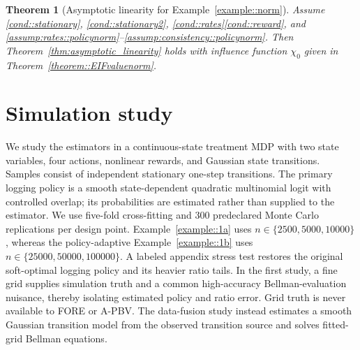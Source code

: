 \documentclass[12pt]{article}
\theoremstyle{plain}
\newtheorem{theorem}{Theorem}
\begin{document}
 
\begin{theorem}[Asymptotic linearity for Example~\ref{example::norm}]
\label{theorem::ALex2}
Assume \ref{cond::stationary}, \ref{cond::stationary2},
\ref{cond::rates}\ref{cond::reward}, and
\ref{assump:rates::policynorm}--\ref{assump:consistency::policynorm}.
Then Theorem~\ref{thm:asymptotic_linearity} holds with influence function
\(\chi_0\) given in Theorem~\ref{theorem::EIFvaluenorm}.
\end{theorem}




 
\section{Simulation study}
\label{sec:simulation}

We study the estimators in a continuous-state treatment MDP with
two state variables, four actions, nonlinear rewards, and Gaussian state
transitions. Samples consist of independent stationary one-step transitions.
The primary logging policy is a smooth state-dependent quadratic multinomial
logit with controlled overlap; its probabilities are estimated rather than
supplied to the estimator. We use five-fold cross-fitting and 300 predeclared
Monte Carlo replications per design point. Example~\ref{example::1a} uses
$n\in\{2500,5000,10000\}$, whereas the policy-adaptive
Example~\ref{example::1b} uses $n\in\{25000,50000,100000\}$. A labeled
appendix stress test restores the original soft-optimal logging policy and its
heavier ratio tails. In the first study, a fine grid supplies simulation truth
and a common high-accuracy Bellman-evaluation nuisance, thereby isolating
estimated policy and ratio error. Grid truth is never available to FORE or
A-PBV. The data-fusion study instead estimates a smooth Gaussian transition
model from the observed transition source and solves fitted-grid Bellman equations.
\end{document}
